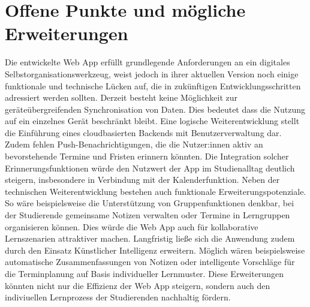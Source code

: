 \section{Offene Punkte und mögliche Erweiterungen}
Die entwickelte Web App erfüllt grundlegende Anforderungen an ein digitales Selbstorganisationswerkzeug, weist jedoch in ihrer aktuellen Version noch einige funktionale und technische Lücken auf, die in zukünftigen Entwicklungsschritten adressiert werden sollten.\newline 
Derzeit besteht keine Möglichkeit zur geräteübergreifenden Synchronisation von Daten. Dies bedeutet dass die Nutzung auf ein einzelnes Gerät beschränkt bleibt. Eine logische Weiterentwicklung stellt die Einführung eines cloudbasierten Backends mit Benutzerverwaltung dar.\newline 
Zudem fehlen Push-Benachrichtigungen, die die Nutzer:innen aktiv an bevorstehende Termine und Fristen erinnern könnten. Die Integration solcher Erinnerungsfunktionen würde den Nutzwert der App im Studienalltag deutlich steigern, insbesondere in Verbindung mit der Kalenderfunktion.\newline 
Neben der technischen Weiterentwicklung bestehen auch funktionale Erweiterungspotenziale. So wäre beispielsweise die Unterstützung von Gruppenfunktionen denkbar, bei der Studierende gemeinsame Notizen verwalten oder Termine in Lerngruppen organisieren können. Dies würde die Web App auch für kollaborative Lernszenarien attraktiver machen.\newline 
Langfristig ließe sich die Anwendung zudem durch den Einsatz Künstlicher Intelligenz erweitern. Möglich wären beispielsweise automatische Zusammenfassungen von Notizen oder intelligente Vorschläge für die Terminplanung auf Basis individueller Lernmuster. Diese Erweiterungen könnten nicht nur die Effizienz der Web App steigern, sondern auch den indiviuellen Lernprozess der Studierenden nachhaltig fördern.